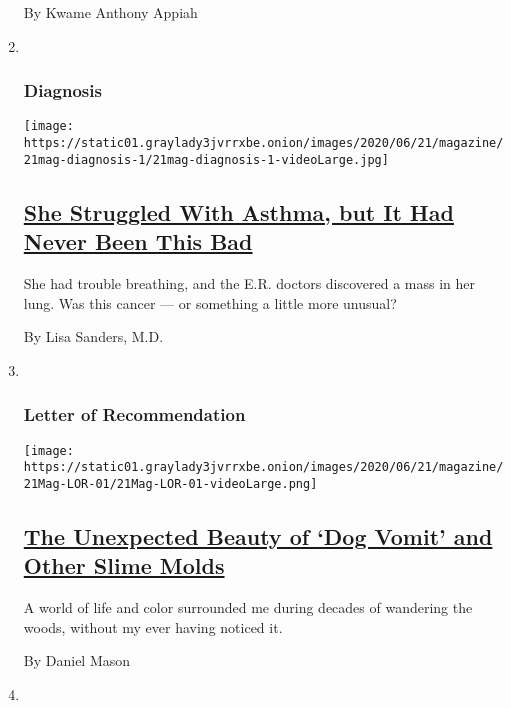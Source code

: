 \begin{enumerate}
  By Kwame Anthony Appiah
\item ~
  \hypertarget{diagnosis}{%
  \subsubsection{Diagnosis}\label{diagnosis}}

  \texttt{[image: https://static01.graylady3jvrrxbe.onion/images/2020/06/21/magazine/21mag-diagnosis-1/21mag-diagnosis-1-videoLarge.jpg]}

  \hypertarget{she-struggled-with-asthma-but-it-had-never-been-this-bad}{%
  \subsection{\texorpdfstring{\href{/2020/06/17/magazine/foreign-body-aspiration-diagnosis.html}{She
  Struggled With Asthma, but It Had Never Been This
  Bad}}{She Struggled With Asthma, but It Had Never Been This Bad}}\label{she-struggled-with-asthma-but-it-had-never-been-this-bad}}

  She had trouble breathing, and the E.R. doctors discovered a mass in
  her lung. Was this cancer --- or something a little more unusual?

  By Lisa Sanders, M.D.
\item ~
  \hypertarget{letter-of-recommendation}{%
  \subsubsection{Letter of
  Recommendation}\label{letter-of-recommendation}}

  \texttt{[image: https://static01.graylady3jvrrxbe.onion/images/2020/06/21/magazine/21Mag-LOR-01/21Mag-LOR-01-videoLarge.png]}

  \hypertarget{the-unexpected-beauty-of-dog-vomit-and-other-slime-molds}{%
  \subsection{\texorpdfstring{\href{/2020/06/16/magazine/the-unexpected-beauty-of-dog-vomit-and-other-slime.html}{The
  Unexpected Beauty of `Dog Vomit' and Other Slime
  Molds}}{The Unexpected Beauty of `Dog Vomit' and Other Slime Molds}}\label{the-unexpected-beauty-of-dog-vomit-and-other-slime-molds}}

  A world of life and color surrounded me during decades of wandering
  the woods, without my ever having noticed it.

  By Daniel Mason
\item ~
  \hypertarget{eat}{%
}
\end{enumerate}
